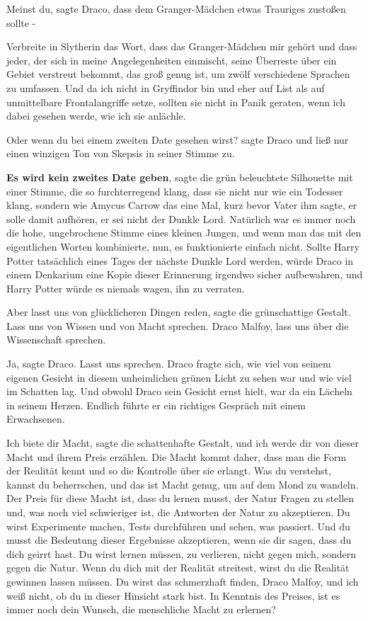 \glqq Meinst du\grqq{}, sagte Draco, \glqq dass dem Granger-Mädchen etwas
Trauriges zustoßen sollte -\grqq{}

\glqq Verbreite in Slytherin das Wort, dass das Granger-Mädchen mir gehört und
dass jeder, der sich in meine Angelegenheiten einmischt, seine Überreste über
ein Gebiet verstreut bekommt, das groß genug ist, um zwölf verschiedene Sprachen
zu umfassen. Und da ich nicht in Gryffindor bin und eher auf List als auf
unmittelbare Frontalangriffe setze, sollten sie nicht in Panik geraten, wenn ich
dabei gesehen werde, wie ich sie anlächle.\grqq{}

\glqq Oder wenn du bei einem zweiten Date gesehen wirst?\grqq{} sagte Draco und
ließ nur einen winzigen Ton von Skepsis in seiner Stimme zu.

\textbf{ \glqq Es wird kein zweites Date geben\grqq{}}, sagte die grün
beleuchtete Silhouette mit einer Stimme, die so furchterregend klang, dass sie
nicht nur wie ein Todesser klang, sondern wie Amycus Carrow das eine Mal, kurz
bevor Vater ihm sagte, er solle damit aufhören, er sei nicht der Dunkle Lord.
Natürlich war es immer noch die hohe, ungebrochene Stimme eines kleinen Jungen,
und wenn man das mit den eigentlichen Worten kombinierte, nun, es funktionierte
einfach nicht. Sollte Harry Potter tatsächlich eines Tages der nächste Dunkle
Lord werden, würde Draco in einem Denkarium eine Kopie dieser Erinnerung
irgendwo sicher aufbewahren, und Harry Potter würde es niemals wagen, ihn zu
verraten.

\glqq Aber lasst uns von glücklicheren Dingen reden\grqq{}, sagte die
grünschattige Gestalt. \glqq Lass uns von Wissen und von Macht sprechen. Draco
Malfoy, lass uns über die Wissenschaft sprechen.\grqq{}

\glqq Ja\grqq{}, sagte Draco. \glqq Lasst uns sprechen.\grqq{} Draco fragte
sich, wie viel von seinem eigenen Gesicht in diesem unheimlichen grünen Licht zu
sehen war und wie viel im Schatten lag. Und obwohl Draco sein Gesicht ernst
hielt, war da ein Lächeln in seinem Herzen. Endlich führte er ein richtiges
Gespräch mit einem Erwachsenen.

\glqq Ich biete dir Macht\grqq{}, sagte die schattenhafte Gestalt, \glqq und
ich werde dir von dieser Macht und ihrem Preis erzählen. Die Macht kommt daher,
dass man die Form der Realität kennt und so die Kontrolle über sie erlangt. Was
du verstehst, kannst du beherrschen, und das ist Macht genug, um auf dem Mond zu
wandeln. Der Preis für diese Macht ist, dass du lernen musst, der Natur Fragen
zu stellen und, was noch viel schwieriger ist, die Antworten der Natur zu
akzeptieren. Du wirst Experimente machen, Tests durchführen und sehen, was
passiert. Und du musst die Bedeutung dieser Ergebnisse akzeptieren, wenn sie dir
sagen, dass du dich geirrt hast. Du wirst lernen müssen, zu verlieren, nicht
gegen mich, sondern gegen die Natur. Wenn du dich mit der Realität streitest,
wirst du die Realität gewinnen lassen müssen. Du wirst das schmerzhaft finden,
Draco Malfoy, und ich weiß nicht, ob du in dieser Hinsicht stark bist. In
Kenntnis des Preises, ist es immer noch dein Wunsch, die menschliche Macht zu
erlernen?\grqq{}

